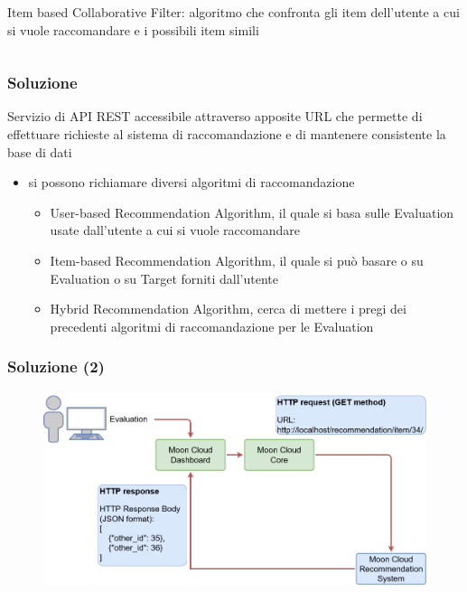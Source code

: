 \begin{frame}
\begin{columns}
\begin{column}{0.5\textwidth}
\begin{figure}
            \end{figure}
            \alert{Item based Collaborative Filter}: algoritmo che confronta gli item dell'utente a cui si vuole raccomandare e i possibili item simili 
        \end{column}
    \end{columns}
\end{frame}

\begin{frame}
    \frametitle{Soluzione}
    Servizio di \alert{API REST} accessibile attraverso apposite URL che permette di effettuare richieste al sistema di 
    raccomandazione e di mantenere consistente la base di dati
    \begin{itemize}
        \item si possono richiamare diversi algoritmi di raccomandazione
        \begin{itemize}
            \item \alert{User-based Recommendation Algorithm}, il quale si basa sulle Evaluation usate dall'utente a cui si vuole raccomandare 
            \item \alert{Item-based Recommendation Algorithm}, il quale si può basare o su Evaluation o su Target forniti dall'utente 
            \item \alert{Hybrid Recommendation Algorithm}, cerca di mettere i pregi dei precedenti algoritmi di raccomandazione per le Evaluation 
        \end{itemize}
    \end{itemize}
\end{frame}

\begin{frame}
    \frametitle{Soluzione (2)}
    \begin{figure}
        \centering
        \includegraphics[scale=0.32]{images/UML_MoonCloud_HowToDoPres}
    \end{figure}
\end{frame}

